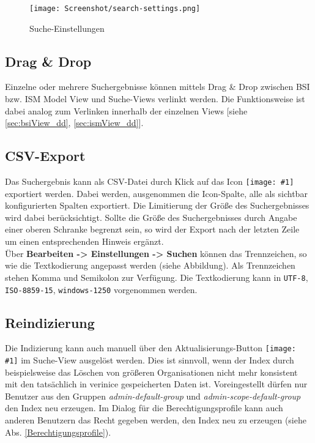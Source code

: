 \documentclass[a4paper,10pt]{book}
\newcommand{\icon}[1]{\texttt{[image: \#1]}}
\begin{document}
\begin{figure}[h]
  \centering
  \texttt{[image: Screenshot/search-settings.png]}
  \caption{Suche-Einstellungen}
  \label{fig:search-settings}
\end{figure}

\subsection{Drag \& Drop}
Einzelne oder mehrere Suchergebnisse können mittels Drag \& Drop zwischen
BSI bzw. ISM Model View und Suche-Views verlinkt werden. Die
Funktionsweise ist dabei analog zum Verlinken innerhalb der einzelnen Views
[siehe \ref{sec:bsiView_dd}, \ref{sec:ismView_dd}].

\subsection{CSV-Export}
\label{sec:csv-export}

Das Suchergebnis kann als CSV-Datei durch Klick auf das
Icon \icon{Icon/Export.png} exportiert
werden. Dabei werden, ausgenommen die Icon-Spalte, alle als sichtbar
konfigurierten Spalten exportiert.  Die Limitierung der Größe des
Suchergebnisses wird dabei berücksichtigt. Sollte die Größe des
Suchergebnisses durch Angabe einer oberen Schranke begrenzt sein, so
wird der Export nach der letzten Zeile um einen entsprechenden Hinweis
ergänzt.\\

Über \textbf{Bearbeiten -> Einstellungen -> Suchen} können das
Trennzeichen, so wie die Textkodierung angepasst werden (siehe
Abbildung). Als Trennzeichen stehen Komma und Semikolon zur
Verfügung. Die Textkodierung kann in \texttt{UTF-8},
\texttt{ISO-8859-15}, \texttt{windows-1250} vorgenommen werden.

\subsection{Reindizierung}
\label{sec:indizierung}

Die Indizierung kann auch manuell über den
Aktualisierungs-Button \icon{Icon/Aktualisieren.png}
im Suche-View ausgelöst werden. Dies ist sinnvoll, wenn der Index
durch beispielsweise das Löschen von größeren Organisationen nicht
mehr konsistent mit den tatsächlich in verinice gespeicherten Daten
ist. Voreingestellt dürfen nur Benutzer aus den Gruppen \textit{admin-default-group} und \textit{admin-scope-default-group} den Index neu erzeugen.
Im Dialog für die Berechtigungsprofile kann auch anderen Benutzern das Recht gegeben werden, den Index neu zu erzeugen (siehe Abs. \ref{Berechtigungsprofile}).
\end{document}
